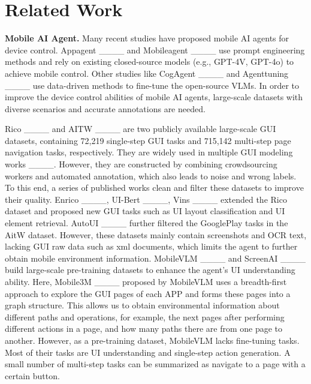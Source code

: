 \section{Related Work}
\textbf{Mobile AI Agent.}
Many recent studies have proposed mobile AI agents for device control. Appagent ____ and Mobileagent ____  use prompt engineering methods and rely on existing closed-source models (e.g., GPT-4V, GPT-4o) to achieve mobile control. Other studies like CogAgent ____ and Agenttuning ____ use data-driven methods to fine-tune the open-source VLMs.
In order to improve the device control abilities of mobile AI agents, large-scale datasets with diverse scenarios and accurate annotations are needed.

Rico ____ and AITW ____  are two publicly available large-scale GUI datasets, containing 72,219 single-step GUI tasks and 715,142 multi-step page navigation tasks, respectively. They are widely used in multiple GUI modeling works ____.
However, they are constructed by combining crowdsourcing workers and automated annotation, which also leads to noise and wrong labels. 
To this end, a series of published works clean and filter these datasets to improve their quality.
Enrico ____, UI-Bert ____, Vins ____ extended the Rico dataset and proposed new GUI tasks such as UI layout classification and UI element retrieval. AutoUI ____ further filtered the GooglePlay tasks in the AitW dataset. However, these datasets mainly contain screenshots and OCR text, lacking GUI raw data such as xml documents, which limits the agent to further obtain mobile environment information. 
MobileVLM ____ and ScreenAI ____ build large-scale pre-training datasets to enhance the agent’s UI understanding ability. Here, Mobile3M ____ proposed by MobileVLM uses a breadth-first approach to explore the GUI pages of each APP and forms these pages into a graph structure. This allows us to obtain environmental information about different paths and operations, for example, the next pages after performing different actions in a page, and how many paths there are from one page to another.
However, as a pre-training dataset, MobileVLM lacks fine-tuning tasks. Most of their tasks are UI understanding and single-step action generation. A small number of multi-step tasks can be summarized as navigate to a page with a certain button.

